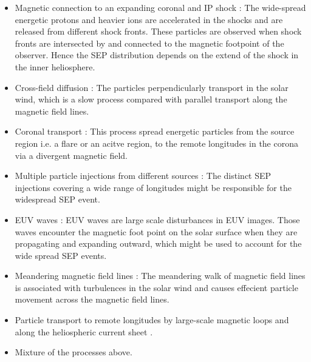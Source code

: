 \begin{itemize}
	\item Magnetic connection to an expanding coronal and IP shock \citep{Cliver1995ICRC, Torsti1999JGR, Reames1999, cane2003two, Richardson2014SoPh, Kouloumvakos2019ApJ}: 
	The wide-spread energetic protons and heavier ions are accelerated in the shocks and are released from different shock fronts. These particles are observed when shock fronts are intersected by and connected to the magnetic footpoint of the observer. Hence the \ac{SEP} distribution depends on the extend of the shock in the inner heliosphere.

	\item Cross-field diffusion \citep{Dresing2012SoPh}: The particles perpendicularly transport in the solar wind, which is a slow process compared with parallel transport along the magnetic field lines.
	
	\item Coronal transport \citep{Reinhard1974SoPh, Newkirk1978JGR}: This process spread energetic particles from the source region i.e. a flare or an acitve region, to the remote longitudes in the corona via a divergent magnetic field. 

	\item Multiple particle injections from different sources \citep{Dresing2023The17}: The distinct \ac{SEP} injections covering a wide range of longitudes might be responsible for the widespread \ac{SEP} event.

	\item \ac{EUV} waves \citep{Rouillard2012ApJ, Park2013ApJ}: \ac{EUV} waves are large scale disturbances in \ac{EUV} images. Those waves encounter the magnetic foot point on the solar surface when they are propagating and expanding outward, which might be used to account for the wide spread \ac{SEP} events.
	
	\item Meandering magnetic field lines \citep{Laitinen2016AA, Laitinen2023ApJL}: The meandering walk of magnetic field lines is associated with turbulences in the solar wind and causes effecient particle movement across the magnetic field lines.
	\item Particle transport to remote longitudes by large-scale magnetic loops \citep{Klassen2018AA, Schrijver2013ApJ} and along the heliospheric current sheet \citep{Battarbee2018ApJ}.
	\item Mixture of the processes above.
\end{itemize}


